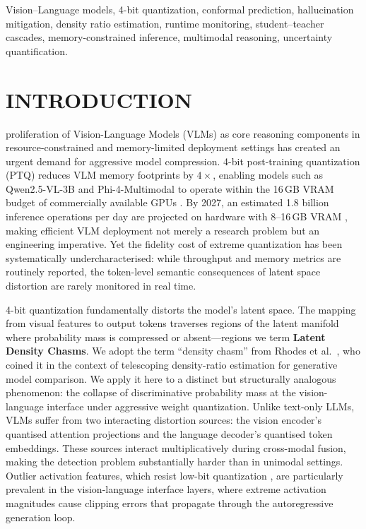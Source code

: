 \documentclass{ieeetmlcn}
\begin{document}
\begin{IEEEkeywords}
Vision--Language models, 4-bit quantization, conformal prediction,
hallucination mitigation, density ratio estimation, runtime monitoring,
student--teacher cascades, memory-constrained inference, multimodal
reasoning, uncertainty quantification.
\end{IEEEkeywords}


\maketitle

\section{INTRODUCTION}
 proliferation of Vision-Language Models (VLMs) as
core reasoning components in resource-constrained and memory-limited
deployment settings has created an urgent demand for aggressive model compression. 4-bit
post-training quantization (PTQ) reduces VLM memory footprints by
$4\times$, enabling models such as Qwen2.5-VL-3B and Phi-4-Multimodal
to operate within the 16\,GB VRAM budget of commercially available GPUs
\cite{lin2024awq,dettmers2023qlora}. By 2027, an estimated 1.8 billion
inference operations per day are projected on hardware with 8--16\,GB
VRAM \cite{chen2025ktransformers}, making efficient VLM deployment not
merely a research problem but an engineering imperative. Yet the fidelity cost of extreme quantization has been
systematically undercharacterised: while throughput and memory metrics
are routinely reported, the token-level semantic consequences of latent
space distortion are rarely monitored in real time.

4-bit quantization fundamentally distorts the model's latent space. The
mapping from visual features to output tokens traverses regions of the
latent manifold where probability mass is compressed or absent---regions
we term \textbf{Latent Density Chasms}. We adopt the term ``density chasm'' from Rhodes et al.\ \cite{NEURIPS2020_33d3b157}, who coined it in the context of telescoping density-ratio estimation for generative model comparison. We apply it here to a distinct but structurally analogous phenomenon: the collapse of discriminative probability mass at the vision-language interface under aggressive weight quantization. Unlike
text-only LLMs, VLMs suffer from two interacting distortion sources: the
vision encoder's quantised attention projections and the language
decoder's quantised token embeddings. These sources interact
multiplicatively during cross-modal fusion, making the detection problem
substantially harder than in unimodal settings. Outlier activation
features, which resist low-bit quantization , are
particularly prevalent in the vision-language interface layers, where
extreme activation magnitudes cause clipping errors that propagate
through the autoregressive generation loop.
\end{document}
